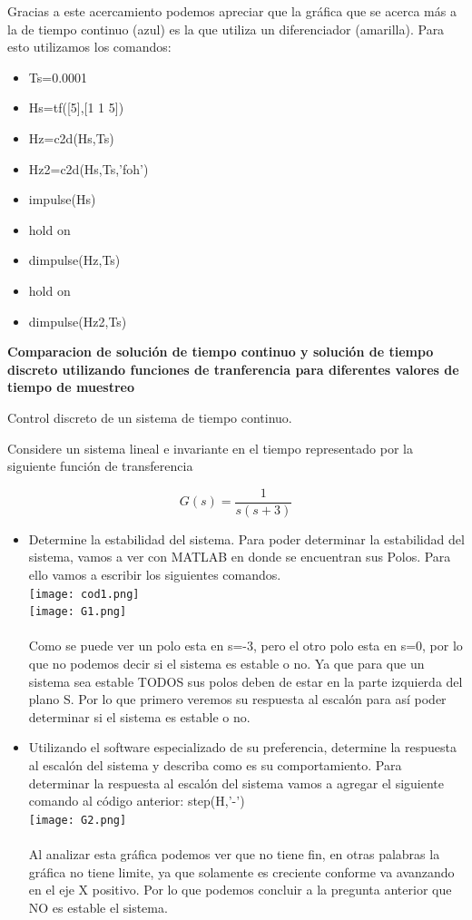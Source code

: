 Gracias a este acercamiento podemos apreciar que la gráfica que se acerca más a la de tiempo continuo (azul) es la que utiliza un diferenciador (amarilla). Para esto utilizamos los comandos:

\begin{itemize}
\item Ts=0.0001
\item Hs=tf([5],[1 1 5])
\item Hz=c2d(Hs,Ts)
\item Hz2=c2d(Hs,Ts,'foh')
\item impulse(Hs)
\item hold on
\item dimpulse(Hz,Ts)
\item hold on
\item dimpulse(Hz2,Ts)
\end{itemize}

\textbf{Comparacion de solución de tiempo continuo y solución de tiempo discreto utilizando funciones de tranferencia para diferentes valores de tiempo de muestreo }

{\Large Control discreto de un sistema de tiempo continuo.}

Considere un sistema lineal e invariante en el tiempo representado por la siguiente función de transferencia

\begin{equation*}
	G(s)=\frac{1}{s(s+3)}
\end{equation*}

\begin{itemize}
	\item Determine la estabilidad del sistema.
Para poder determinar la estabilidad del sistema, vamos a ver con MATLAB en donde se encuentran sus Polos. Para ello vamos a escribir los siguientes comandos.\\
\texttt{[image: cod1.png]}\\
\texttt{[image: G1.png]}\\ \\
Como se puede ver un polo esta en s=-3, pero el otro polo esta en s=0, por lo que no podemos decir si el sistema es estable o no. Ya que para que un sistema sea estable TODOS sus polos deben de estar en la parte izquierda del plano S. Por lo que primero veremos su respuesta al escalón para así poder determinar si el sistema es estable o no.

	\item Utilizando el software especializado de su preferencia, determine la respuesta al escalón del sistema y describa como es su comportamiento.
Para determinar la respuesta al escalón del sistema vamos a agregar el siguiente comando al código anterior: step(H,'-')\\
\texttt{[image: G2.png]} \\ \\
Al analizar esta gráfica podemos ver que no tiene fin, en otras palabras la gráfica no tiene limite, ya que solamente es creciente conforme va avanzando en el eje X positivo. Por lo que podemos concluir a la pregunta anterior que NO es estable el sistema.

\end{itemize}

